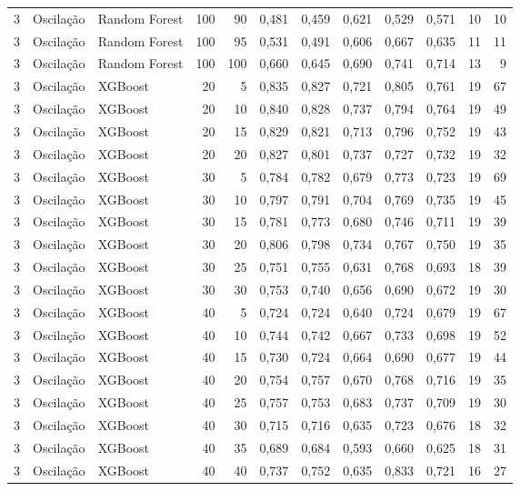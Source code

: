 \begin{longtable}{@{}rllrrrrrrrrr@{}}
3 & Oscilação & Random Forest & 100 & 90 & 0,481 & 0,459 & 0,621 & 0,529 & 0,571 & 10 & 10 \\
3 & Oscilação & Random Forest & 100 & 95 & 0,531 & 0,491 & 0,606 & 0,667 & 0,635 & 11 & 11 \\
3 & Oscilação & Random Forest & 100 & 100 & 0,660 & 0,645 & 0,690 & 0,741 & 0,714 & 13 & 9 \\
3 & Oscilação & XGBoost & 20 & 5 & 0,835 & 0,827 & 0,721 & 0,805 & 0,761 & 19 & 67 \\
3 & Oscilação & XGBoost & 20 & 10 & 0,840 & 0,828 & 0,737 & 0,794 & 0,764 & 19 & 49 \\
3 & Oscilação & XGBoost & 20 & 15 & 0,829 & 0,821 & 0,713 & 0,796 & 0,752 & 19 & 43 \\
3 & Oscilação & XGBoost & 20 & 20 & 0,827 & 0,801 & 0,737 & 0,727 & 0,732 & 19 & 32 \\
3 & Oscilação & XGBoost & 30 & 5 & 0,784 & 0,782 & 0,679 & 0,773 & 0,723 & 19 & 69 \\
3 & Oscilação & XGBoost & 30 & 10 & 0,797 & 0,791 & 0,704 & 0,769 & 0,735 & 19 & 45 \\
3 & Oscilação & XGBoost & 30 & 15 & 0,781 & 0,773 & 0,680 & 0,746 & 0,711 & 19 & 39 \\
3 & Oscilação & XGBoost & 30 & 20 & 0,806 & 0,798 & 0,734 & 0,767 & 0,750 & 19 & 35 \\
3 & Oscilação & XGBoost & 30 & 25 & 0,751 & 0,755 & 0,631 & 0,768 & 0,693 & 18 & 39 \\
3 & Oscilação & XGBoost & 30 & 30 & 0,753 & 0,740 & 0,656 & 0,690 & 0,672 & 19 & 30 \\
3 & Oscilação & XGBoost & 40 & 5 & 0,724 & 0,724 & 0,640 & 0,724 & 0,679 & 19 & 67 \\
3 & Oscilação & XGBoost & 40 & 10 & 0,744 & 0,742 & 0,667 & 0,733 & 0,698 & 19 & 52 \\
3 & Oscilação & XGBoost & 40 & 15 & 0,730 & 0,724 & 0,664 & 0,690 & 0,677 & 19 & 44 \\
3 & Oscilação & XGBoost & 40 & 20 & 0,754 & 0,757 & 0,670 & 0,768 & 0,716 & 19 & 35 \\
3 & Oscilação & XGBoost & 40 & 25 & 0,757 & 0,753 & 0,683 & 0,737 & 0,709 & 19 & 30 \\
3 & Oscilação & XGBoost & 40 & 30 & 0,715 & 0,716 & 0,635 & 0,723 & 0,676 & 18 & 32 \\
3 & Oscilação & XGBoost & 40 & 35 & 0,689 & 0,684 & 0,593 & 0,660 & 0,625 & 18 & 31 \\
3 & Oscilação & XGBoost & 40 & 40 & 0,737 & 0,752 & 0,635 & 0,833 & 0,721 & 16 & 27 \\

\end{longtable}
